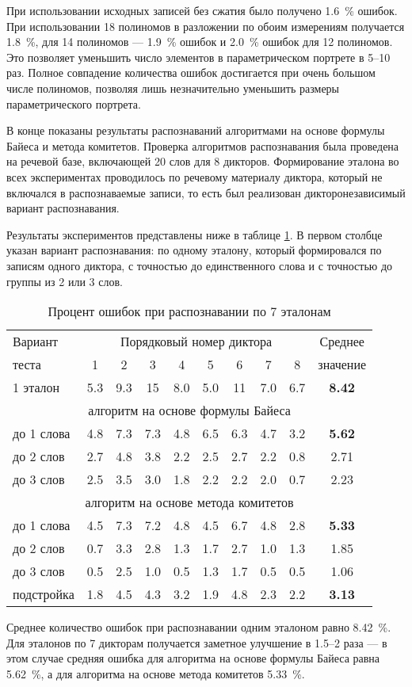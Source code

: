 При использовании исходных записей без сжатия было получено 1.6~\% ошибок.
При использовании 18 полиномов в разложении по обоим измерениям получается 1.8~\%, для 14 полиномов --- 1.9~\% ошибок и 2.0~\% ошибок для 12 полиномов.
Это позволяет уменьшить число элементов в параметрическом портрете в 5--10 раз.
Полное совпадение количества ошибок достигается при очень большом числе полиномов, позволяя лишь незначительно уменьшить размеры параметрического портрета.

В конце показаны результаты распознаваний алгоритмами на основе формулы Байеса и метода комитетов.
Проверка алгоритмов распознавания была проведена на речевой базе, включающей 20 слов для 8 дикторов.
Формирование эталона во всех экспериментах проводилось по речевому материалу диктора, который не включался в распознаваемые записи, то есть был реализован дикторонезависимый вариант распознавания.

Результаты экспериментов представлены ниже в таблице \ref{tab:3_4}.
В первом столбце указан вариант распознавания: по одному эталону, который формировался по записям одного диктора, с точностью до единственного слова и с точностью до группы из 2 или 3 слов.
\begin{table}[h]
	\centering
	\caption{Процент ошибок при распознавании по 7 эталонам}
	\label{tab:3_4}
	\begin{tabular}{| l | c | c | c | c | c | c | c | c | c |}
		\hline
		Вариант & \multicolumn{8}{c|}{Порядковый номер диктора} & Среднее \\
		\hhline{~--------}
		теста & 1 & 2 & 3 & 4 & 5 & 6 & 7 & 8 & \phantom{0}значение\phantom{0} \\
		\hline
		\hline
		1 эталон	& 5.3 & 9.3 & 15  & 8.0 & 5.0 & 11  & 7.0 & 6.7 & \textbf{8.42} \\
		\hline
		\multicolumn{10}{|c|}{алгоритм на основе формулы Байеса} \\
		\hline
		до 1 слова	& 4.8 & 7.3 & 7.3 & 4.8 & 6.5 & 6.3 & 4.7 & 3.2 & \textbf{5.62} \\
		до 2 слов	& 2.7 & 4.8 & 3.8 & 2.2 & 2.5 & 2.7 & 2.2 & 0.8 & 2.71 \\
		до 3 слов	& 2.5 & 3.5 & 3.0 & 1.8 & 2.2 & 2.2 & 2.0 & 0.7 & 2.23 \\
		\hline
		\multicolumn{10}{|c|}{алгоритм на основе метода комитетов} \\
		\hline
		до 1 слова	& 4.5 & 7.3 & 7.2 & 4.8 & 4.5 & 6.7 & 4.8 & 2.8 & \textbf{5.33} \\
		до 2 слов	& 0.7 & 3.3 & 2.8 & 1.3 & 1.7 & 2.7 & 1.0 & 1.3 & 1.85 \\
		до 3 слов	& 0.5 & 2.5 & 1.0 & 0.5 & 1.3 & 1.7 & 0.5 & 0.5 & 1.06 \\
		\hline
		подстройка\phantom{00}	& 1.8 & 4.5 & 4.3 & 3.2 & 1.9 & 4.8 & 2.3 & 2.2 & \textbf{3.13} \\
		\hline
	\end{tabular}
\end{table}
Среднее количество ошибок при распознавании одним эталоном равно 8.42~\%.
Для эталонов по 7 дикторам получается заметное улучшение в 1.5--2 раза --- в этом случае средняя ошибка для алгоритма на основе формулы Байеса равна 5.62~\%, а для алгоритма на основе метода комитетов 5.33~\%.

